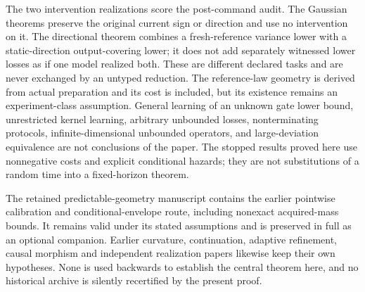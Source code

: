 The two intervention realizations score the post-command audit. The Gaussian theorems preserve the original current sign or direction and use no intervention on it. The directional theorem combines a fresh-reference variance lower with a static-direction output-covering lower; it does not add separately witnessed lower losses as if one model realized both. These are different declared tasks and are never exchanged by an untyped reduction. The reference-law geometry is derived from actual preparation and its cost is included, but its existence remains an experiment-class assumption. General learning of an unknown gate lower bound, unrestricted kernel learning, arbitrary unbounded losses, nonterminating protocols, infinite-dimensional unbounded operators, and large-deviation equivalence are not conclusions of the paper. The stopped results proved here use nonnegative costs and explicit conditional hazards; they are not substitutions of a random time into a fixed-horizon theorem.

The retained predictable-geometry manuscript contains the earlier pointwise calibration and conditional-envelope route, including nonexact acquired-mass bounds. It remains valid under its stated assumptions and is preserved in full as an optional companion. Earlier curvature, continuation, adaptive refinement, causal morphism and independent realization papers likewise keep their own hypotheses. None is used backwards to establish the central theorem here, and no historical archive is silently recertified by the present proof.


